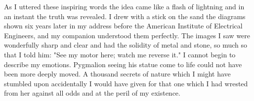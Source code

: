 \documentclass[a4paper,12pt,english,twoside,openright]{memoir}
\begin{document}
As I uttered these inspiring words the idea came like a flash of lightning and in an instant the truth 
was revealed.  I drew with a stick on the sand the diagrams shown six years later in my address 
before the American Institute of Electrical Engineers, and my companion understood them 
perfectly.  The images I saw were wonderfully sharp and clear and had the solidity of metal and 
stone, so much so that I told him: "See my motor here; watch me reverse it." I cannot begin to 
describe my emotions.  Pygmalion seeing his statue come to life could not have been more 
deeply moved.  A thousand secrets of nature which I might have stumbled upon accidentally I 
would have given for that one which I had wrested from her against all odds and at the peril of my 
existence.
\newpage 


	{\centering
		\aldine\\
		\aldine\hspace{1.2em}\aldine
		\par}
	\vspace*{2cm}
	
\end{document}
